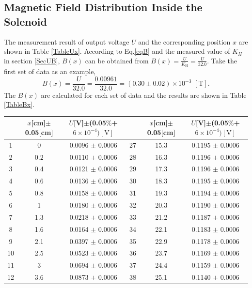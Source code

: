 \documentclass{article}
\begin{document}
	\subsection{Magnetic Field Distribution Inside the Solenoid}

The measurement result of output voltage $U$ and the corresponding position $x$ are shown in Table \ref{TableUx}. According to Eq.\eqref{eqB} and the measured value of $K_{H}$ in section \ref{SecUB}, $B(x)$ can be obtained from $\displaystyle B(x) = \frac{U}{K_\text{H}} = \frac{U}{32.0} .$
Take the first set of data as an example, $$B(x) = \frac{U}{32.0} = \frac{0.00961}{32.0} = (0.30 \pm 0.02) \times 10^{-3} \,\,[\text{T}].$$ 
The $B(x)$ are calculated for each set of data and the results are shown in Table \ref{TableBx}.

\begin{table}[htbp]
\centering
\begin{tabular}{ccc||ccc}
\toprule
& $x$[cm]$\pm$0.05[cm] & $U$[V]$\pm$(0.05$\%$+$6 \times 10^{-4})[\text{V}]$ & & $x$[cm]$\pm$0.05[cm] & $U$[V]$\pm$(0.05$\%$+$6 \times 10^{-4})[\text{V}]$\\
\midrule
    1     & 0    & 0.0096 $\pm$ 0.0006 & 27    & 15.3  & 0.1195 $\pm$ 0.0006 \\
    2     & 0.2  & 0.0110 $\pm$ 0.0006 & 28    & 16.3  & 0.1196 $\pm$ 0.0006 \\
    3     & 0.4  & 0.0121 $\pm$ 0.0006 & 29    & 17.3  & 0.1196 $\pm$ 0.0006 \\
    4     & 0.6  & 0.0136 $\pm$ 0.0006 & 30    & 18.3  & 0.1195 $\pm$ 0.0006 \\
    5     & 0.8  & 0.0158 $\pm$ 0.0006 & 31    & 19.3  & 0.1194 $\pm$ 0.0006 \\
    6     & 1    & 0.0180 $\pm$ 0.0006 & 32    & 20.3  & 0.1190 $\pm$ 0.0006 \\
    7     & 1.3  & 0.0218 $\pm$ 0.0006 & 33    & 21.2  & 0.1187 $\pm$ 0.0006 \\
    8     & 1.6  & 0.0164 $\pm$ 0.0006 & 34    & 22.1  & 0.1183 $\pm$ 0.0006 \\
    9     & 2.1  & 0.0397 $\pm$ 0.0006 & 35    & 22.9  & 0.1178 $\pm$ 0.0006 \\
    10    & 2.5  & 0.0523 $\pm$ 0.0006 & 36    & 23.7  & 0.1169 $\pm$ 0.0006 \\
    11    & 3    & 0.0694 $\pm$ 0.0006 & 37    & 24.4  & 0.1159 $\pm$ 0.0006 \\
    12    & 3.6  & 0.0873 $\pm$ 0.0006 & 38    & 25.1  & 0.1140 $\pm$ 0.0006 \\

\end{tabular}
\end{table}
\end{document}
